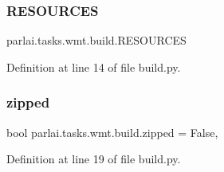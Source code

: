 \subsubsection{\texorpdfstring{R\+E\+S\+O\+U\+R\+C\+ES}{RESOURCES}}
{\footnotesize\ttfamily parlai.\+tasks.\+wmt.\+build.\+R\+E\+S\+O\+U\+R\+C\+ES}



Definition at line 14 of file build.\+py.

\mbox{\label{namespaceparlai_1_1tasks_1_1wmt_1_1build_a57b7ea8cd94546ecabb37c23515d739b}} 
\subsubsection{\texorpdfstring{zipped}{zipped}}
{\footnotesize\ttfamily bool parlai.\+tasks.\+wmt.\+build.\+zipped = False,}



Definition at line 19 of file build.\+py.

